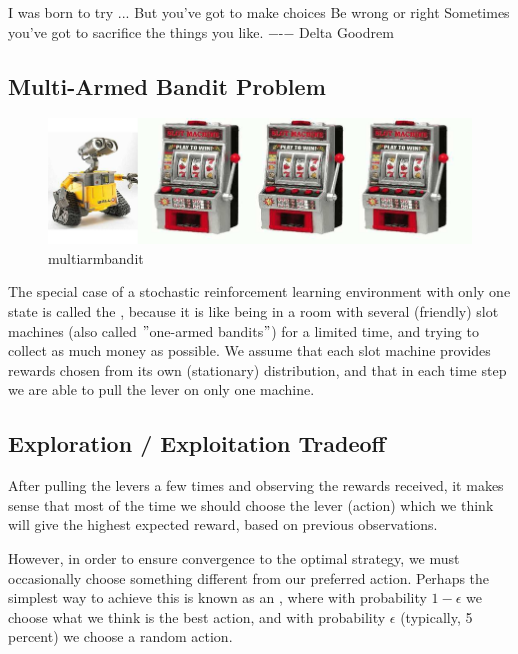 \documentclass[11pt]{article}
\begin{document}
    I was born to try ...
    But you've got to make choices
    Be wrong or right
    Sometimes you've got to sacrifice the things you like.
    −\qquad-− Delta Goodrem

\subsection{Multi-Armed Bandit Problem}\label{subsec:multi-armed-bandit-problem}

\begin{figure}[h]
    \centering
    \includegraphics[width=\textwidth]{../out/images//multiarm_bandit}
    \caption[Multiarm Bandit]{multiarmbandit}
    \label{fig:multiarm_bandit}
\end{figure}

The special case of a stochastic reinforcement learning environment with only
one state is called the , because it is like being
in a room with several (friendly) slot machines (also called \("\)one-armed
bandits\("\)) for a limited time, and trying to collect as much money as
possible.
We assume that each slot machine provides rewards chosen from its own
(stationary) distribution, and that in each time step we are able to pull the
lever on only one machine.

\subsection{Exploration / Exploitation Tradeoff}\label{subsec:exploration-/-exploitation-tradeoff}
After pulling the levers a few times and observing the rewards received, it
makes sense that most of the time we should choose the lever (action) which we
think will give the highest expected reward, based on previous observations.

However, in order to ensure convergence to the optimal strategy, we must
occasionally choose something different from our preferred action.
Perhaps the simplest way to achieve this is known as an , where with probability $1 - \epsilon$ we choose what we think is the
best action, and with probability $\epsilon$ (typically, 5 percent) we choose
a random action.
\end{document}
